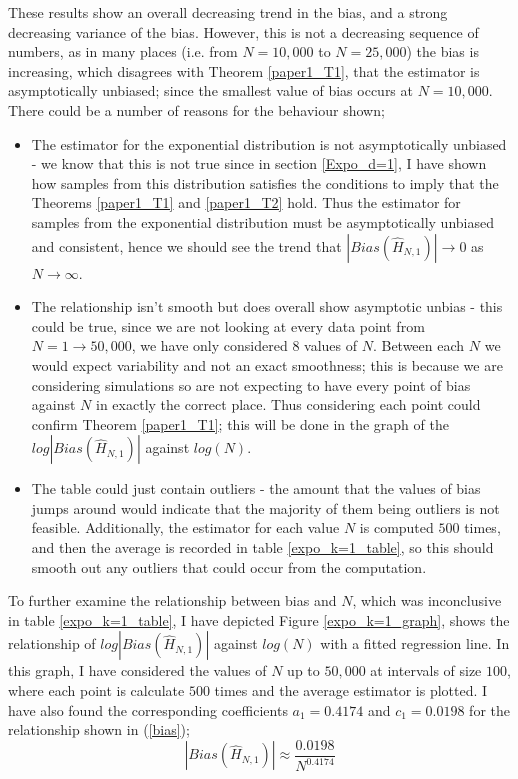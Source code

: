 \documentclass{article}
\begin{document}
These results show an overall decreasing trend in the bias, and a strong decreasing variance of the bias. However, this is not a decreasing sequence of numbers, as in many places (i.e. from $N=10,000$ to $N=25,000$) the bias is increasing, which disagrees with Theorem \ref{paper1_T1}, that the estimator is asymptotically unbiased; since the smallest value of bias occurs at $N=10,000$. There could be a number of reasons for the behaviour shown;
\begin{itemize}
\item The estimator for the exponential distribution is not asymptotically unbiased - we know that this is not true since in section \ref{Expo_d=1}, I have shown how samples from this distribution satisfies the conditions to imply that the Theorems \ref{paper1_T1} and \ref{paper1_T2} hold. Thus the estimator for samples from the exponential distribution must be asymptotically unbiased and consistent, hence we should see the trend that $|Bias(\hat{H}_{N, 1})| \to 0$ as $N \to \infty$.
\item The relationship isn't smooth but does overall show asymptotic unbias -  this could be true, since we are not looking at every data point from $N = 1 \to 50,000$, we have only considered 8 values of $N$. Between each $N$ we would expect variability and not an exact smoothness; this is because we are considering simulations so are not expecting to have every point of bias against $N$ in exactly the correct place. Thus considering each point could confirm Theorem \ref{paper1_T1}; this will be done in the graph of the $log |Bias(\hat{H}_{N, 1})|$ against $log(N)$.
\item The table could just contain outliers - the amount that the values of bias jumps around would indicate that the majority of them being outliers is not feasible. Additionally, the estimator for each value $N$ is computed $500$ times, and then the average is recorded in table \ref{expo_k=1_table}, so this should smooth out any outliers that could occur from the computation.
\end{itemize}

To further examine the relationship between bias and $N$, which was inconclusive in table \ref{expo_k=1_table}, I have depicted Figure \ref{expo_k=1_graph}, shows the relationship of $log|Bias(\hat{H}_{N, 1})|$ against $log(N)$ with a fitted regression line. In this graph, I have considered the values of $N$ up to $50,000$ at intervals of size $100$, where each point is calculate $500$ times and the average estimator is plotted. I have also found the corresponding coefficients $a_{1} = 0.4174$ and $c_{1} = 0.0198$ for the relationship shown in (\ref{bias});
\begin{equation}
|Bias(\hat{H}_{N, 1})| \approx \frac{0.0198}{N^{0.4174}}\nonumber
\end{equation}
\end{document}
